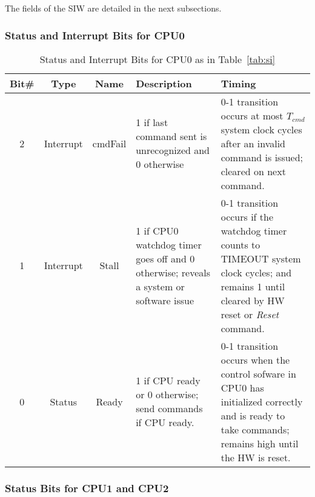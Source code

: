 \documentclass{ug}
\theoremstyle{plain}
\begin{document}
The fields of the SIW are detailed in the next subsections.

\subsubsection{Status and Interrupt Bits for CPU0}

\begin{table}[H]
  \begin{center}
    \begin{tabular}{|c|c|c|p{4cm}|p{5cm}|}
      \hline
      \rowcolor{iob-green}
      \textbf{Bit\#}   & \textbf{Type} & \textbf{Name} &\textbf{Description} & \textbf{Timing} \\
      \hline
      \hline

      2 & Interrupt &  cmdFail & 1 if last command sent is unrecognized and 0
      otherwise & 0-1 transition occurs at most $T_{cmd}$ system clock cycles
      after an invalid command is issued; cleared on next command.\\ \hline

      \rowcolor{iob-blue} 
      1 & Interrupt & Stall & 1 if CPU0 watchdog timer goes off
      and 0 otherwise; reveals a system or software issue & 0-1 transition
      occurs if the watchdog timer counts to TIMEOUT system clock cycles; and
      remains 1 until cleared by HW reset or {\it Reset} command.\\ \hline

      0 & Status & Ready & 1 if CPU ready or 0 otherwise; send
      commands if CPU ready. & 0-1 transition occurs when the control
      sofware in CPU0 has initialized correctly and is ready to take
      commands; remains high until the HW is reset.\\ \hline

    \end{tabular}
    \caption{Status and Interrupt Bits for CPU0 as in Table~\ref{tab:si}}
    \label{tab:cpu0_status_interrpt}
  \end{center}
\end{table}
\clearpage

\subsubsection{Status Bits for CPU1 and CPU2}
\end{document}
